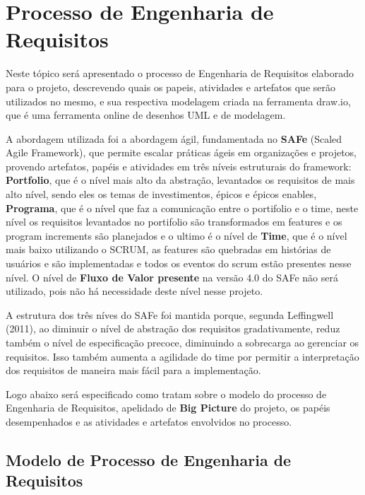 \chapter{Processo de Engenharia de Requisitos}

  Neste tópico será apresentado o processo de Engenharia de Requisitos elaborado para o projeto, descrevendo quais os papeis,
  atividades e artefatos que serão utilizados no mesmo, e sua respectiva modelagem criada na ferramenta draw.io, que é uma
  ferramenta online de desenhos UML e de modelagem.

  A abordagem utilizada foi a abordagem ágil, fundamentada no \textbf{SAFe} (Scaled Agile Framework), que permite escalar práticas
  ágeis em organizações e projetos, provendo artefatos, papéis e atividades em três níveis estruturais do framework: \textbf{Portfolio},
  que é o nível mais alto da abstração, levantados os requisitos de mais alto nível, sendo eles os temas de investimentos, épicos e
  épicos enables, \textbf{Programa}, que é o nível que faz a comunicação entre o portifolio e o time, neste nível os requisitos
  levantados no portifolio são transformados em features e os program increments são planejados e o ultimo é o nível de \textbf{Time},
  que é o nível mais baixo utilizando o SCRUM, as features são quebradas em histórias de usuários e são implementadas e todos os
  eventos do scrum estão presentes nesse nível. O nível de \textbf{Fluxo de Valor presente} na versão 4.0 do SAFe não será utilizado,
  pois não há necessidade deste nível nesse projeto.

  A estrutura dos três níves do SAFe foi mantida porque, segunda Leffingwell (2011), ao diminuir o nível de abstração dos requisitos
  gradativamente, reduz também o nível de especificação precoce, diminuindo a sobrecarga ao gerenciar os requisitos. Isso também
  aumenta a agilidade do time por permitir a interpretação dos requisitos de maneira mais fácil para a implementação.

  Logo abaixo será especificado como tratam sobre o modelo do processo de Engenharia de Requisitos, apelidado de \textbf{Big Picture}
  do projeto, os papéis desempenhados e as atividades e artefatos envolvidos no processo.

\section{Modelo de Processo de Engenharia de Requisitos}

